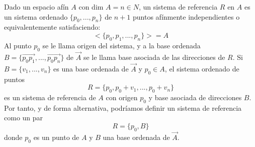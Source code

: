 \documentclass[a4paper,11pt, oneside]{book}
\begin{document}
\begin{sist_referencia}
	Dado un espacio afín $A$ con dim $A = n \in N$, un sistema de referencia $R$ en $A$ es un sistema ordenado $\{p_0, ..., p_n\}$ de $n+1$ puntos afínmente independientes o equivalentemente satisfaciendo:
	\begin{equation}
	<\{p_0,p_1,...,p_n\}> = A
	\end{equation}
	Al punto $p_0$ se le llama origen del sistema, y a la base ordenada $B = \{\overrightarrow{p_0p_1}, ..., \overrightarrow{p_0p_n}\}$ de $\overrightarrow{A}$ se le llama base asociada de las direcciones de $R$.
	Si $B = \{v_1,...,v_n\}$ es una base ordenada de $\overrightarrow{A}$ y $p_0 \in A$, el sistema ordenado de puntos
	\begin{equation}
	R = \{p_0, p_0+v_1, ..., p_0+v_n\}
	\end{equation}
	es un sistema de referencia de $A$ con origen $p_0$ y base asociada de direcciones $B$. Por tanto, y de forma alternativa, podríamos definir un sistema de referencia como un par
	\begin{equation}
	R = \{p_0, B\}
	\end{equation}
	donde $p_0$ es un punto de $A$ y $B$ una base ordenada de $\overrightarrow{A}$.
\end{sist_referencia}
\end{document}
